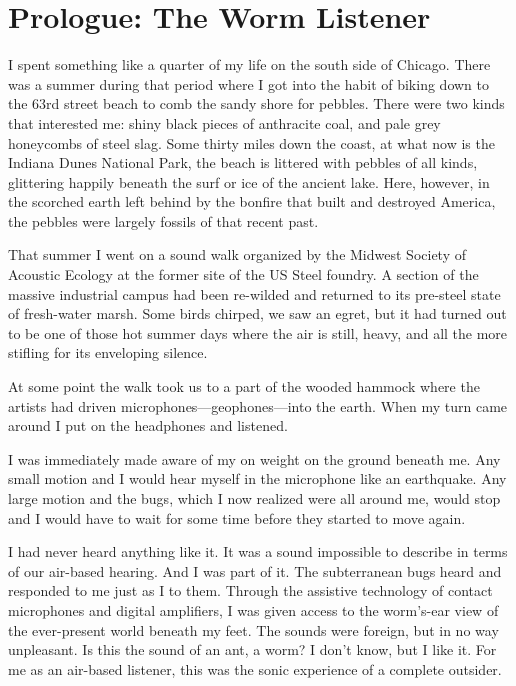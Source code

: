 \documentclass[12pt,letterpaper]{article}
\begin{document}
	\newpage
	\section*{Prologue: The Worm Listener}

	I spent something like a quarter of my life on the south side of 
	Chicago. There was a summer during that period where I got into the 
	habit of biking down to the 63rd street beach to comb the sandy shore 
	for pebbles. There were two kinds that interested me: shiny black 
	pieces of anthracite coal, and pale grey honeycombs of steel slag. Some
	thirty miles down the coast, at what now is the Indiana Dunes National 
	Park, the beach is littered with pebbles of all kinds, glittering 
	happily beneath the surf or ice of the ancient lake. Here, however, in 
	the scorched earth left behind by the bonfire that built and destroyed 
	America, the pebbles were largely fossils of that recent past.

	That summer I went on a sound walk organized by the Midwest Society of
	Acoustic Ecology at the former site of the US Steel foundry. A section 
	of the massive industrial campus had been re-wilded and returned to its
	pre-steel state of fresh-water marsh. Some birds chirped, we saw an 
	egret, but it had turned out to be one of those hot summer days where 
	the air is still, heavy, and all the more stifling for its enveloping 
	silence. 

	At some point the walk took us to a part of the wooded hammock where 
	the artists had driven microphones---geophones---into the earth. When 
	my turn came around I put on the headphones and listened. 

	I was immediately made aware of my on weight on the ground beneath me. 
	Any small motion and I would hear myself in the microphone like an 
	earthquake. Any large motion and the bugs, which I now realized were all
	around me, would stop and I would have to wait for some time before they
	started to move again. 

	I had never heard anything like it. It was a sound impossible to 
	describe in terms of our air-based hearing. And I was part of it. The 
	subterranean bugs heard and responded to me just as I to them. Through 
	the assistive technology of contact microphones and digital amplifiers, 
	I was given access to the worm's-ear view of the ever-present world 
	beneath my feet. The sounds were foreign, but in no way unpleasant. Is 
	this the sound of an ant, a worm? I don't know, but I like it. For me as
	an air-based listener, this was the sonic experience of a complete 
	outsider.	
	
\end{document}
